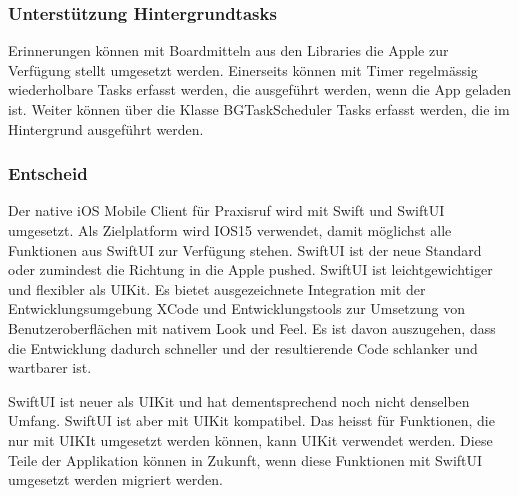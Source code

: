 \subsubsection*{Unterstützung Hintergrundtasks}

Erinnerungen können mit Boardmitteln aus den Libraries die Apple zur Verfügung stellt umgesetzt werden.
Einerseits können mit Timer regelmässig wiederholbare Tasks erfasst werden, die ausgeführt werden, wenn die App geladen ist.\cite{ios_timer}
Weiter können über die Klasse BGTaskScheduler Tasks erfasst werden, die im Hintergrund ausgeführt werden.\cite{ios_bgtaskscheduler}

\subsubsection*{Entscheid}

Der native iOS Mobile Client für Praxisruf wird mit Swift und SwiftUI umgesetzt.
Als Zielplatform wird IOS15 verwendet, damit möglichst alle Funktionen aus SwiftUI zur Verfügung stehen.
SwiftUI ist der neue Standard oder zumindest die Richtung in die Apple pushed.
SwiftUI ist leichtgewichtiger und flexibler als UIKit.
Es bietet ausgezeichnete Integration mit der Entwicklungsumgebung XCode und Entwicklungstools zur Umsetzung
von Benutzeroberflächen mit nativem Look und Feel.
Es ist davon auszugehen, dass die Entwicklung dadurch schneller und der resultierende Code schlanker und wartbarer ist.

SwiftUI ist neuer als UIKit und hat dementsprechend noch nicht denselben Umfang.
SwiftUI ist aber mit UIKit kompatibel.
Das heisst für Funktionen, die nur mit UIKIt umgesetzt werden können, kann UIKit verwendet werden.
Diese Teile der Applikation können in Zukunft, wenn diese Funktionen mit SwiftUI umgesetzt werden migriert werden.

\clearpage
